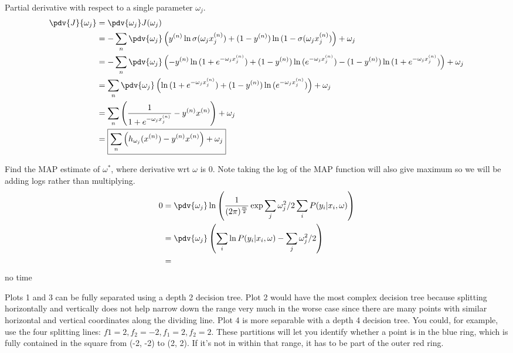 \documentclass{homework}
\begin{document}
\maketitle


\question
Partial derivative with respect to a single parameter $\omega_j$.
\begin{align*}
    \pdv{J}{\omega_j}	&=	\pdv{\omega_j} J(\omega_j) \\
    &=	-  \sum_n  \pdv{\omega_j} \left(y^{(n)} \ln{\sigma(\omega_j x_j^{(n)})} + (1 - y^{(n)}) \ln{(1 - \sigma(\omega_j x_j^{(n)})} \right) + \omega_j	\\
    &=	-  \sum_n  \pdv{\omega_j} \left(- y^{(n)} \ln{(1 + e^{-\omega_j x_j^{(n)}})} + (1 - y^{(n)}) \ln{(e^{-\omega_j x_j^{(n)}})} - (1 - y^{(n)}) \ln{(1 + e^{-\omega_j x_j^{(n)}})} \right) + \omega_j	\\
    &=	\sum_n  \pdv{\omega_j} \left(\ln{(1 + e^{-\omega_j x_j^{(n)}})}  + (1 - y^{(n)}) \ln{(e^{-\omega_j x_j^{(n)}})}\right) + \omega_j	\\
    &=	\sum_n  \left(\frac{1}{1 + e^{-\omega_j x_j^{(n)}}} - y^{(n)} x^{(n)} \right) + \omega_j	\\
    &=	\boxed{\sum_n  \left(h_{\omega_j}(x^{(n)}) - y^{(n)} x^{(n)} \right) + \omega_j}	\\
\end{align*}


\question
Find the MAP estimate of $\omega^*$, where derivative wrt $\omega$ is 0. Note taking the log of the MAP function will also give maximum so we will be adding logs rather than multiplying.
\begin{align*}
    0	&=	\pdv{\omega_j} \ln \left( \frac{1}{(2\pi)^\frac{m}{2}} \exp{\sum_j \omega_j^2/2} \sum_i  P(y_i | x_i, \omega) \right)	\\
    	&=	\pdv{\omega_j} \left(\sum_i  \ln P(y_i | x_i, \omega) - \sum_j \omega_j^2/2 \right)	\\
        &=		\\
\end{align*}
no time


\question


\question


\question
\begin{alphaparts}
    \questionpart Plots 1 and 3 can be fully separated using a depth 2 decision tree.
    \questionpart Plot 2 would have the most complex decision tree because splitting horizontally and vertically does not help narrow down the range very much in the worse case since there are many points with similar horizontal and vertical coordinates along the dividing line.
    \questionpart Plot 4 is more separable with a depth 4 decision tree. You could, for example, use the four splitting lines: $f1 = 2, f_2 = -2, f_1 = 2, f_2 = 2$. These partitions will let you identify whether a point is in the blue ring, which is fully contained in the square from (-2, -2) to (2, 2). If it's not in within that range, it has to be part of the outer red ring.
\end{alphaparts}
\end{document}

